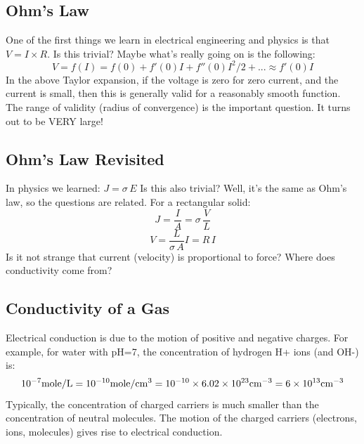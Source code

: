 \subsection{Ohm’s Law}
One of the first things we learn in electrical engineering and physics is that  $V = I \times R$.  Is this trivial? Maybe what’s really going on is the following:
    \begin{equation}
        V = f(I) = f(0) + f'(0)I + f''(0){I^2}/2 + ... \approx f'(0)I
    \end{equation}
In the above Taylor expansion, if the voltage is zero for zero current, and the current is small, then this is generally valid for a reasonably smooth function.   The range of validity (radius of convergence) is the important question. It turns out to be VERY large!
\subsection{Ohm’s Law Revisited}
 In physics we learned:  $J = \sigma \,E$  Is this also trivial? Well, it’s the same as Ohm’s law, so the questions are related. For a rectangular solid:
    \begin{equation}
        J = \frac{I}{A} = \sigma \,\frac{V}{L} \end{equation}\begin{equation}  V = \frac{L}{{\sigma \,A}}I = R\,I
    \end{equation}
Is it not strange that current (velocity) is proportional to force?  Where does conductivity come from?
\subsection{Conductivity of a Gas}
Electrical conduction is due to the motion of positive and negative charges.   For example, for  water with pH=7, the concentration of hydrogen H+ ions (and OH-) is:
    \begin{equation}
        {10^{ - 7}}{\rm{mole/L}} = {\rm{1}}{{\rm{0}}^{{\rm{ - 10}}}}{\rm{mole/c}}{{\rm{m}}^{\rm{3}}}
        = {\rm{1}}{{\rm{0}}^{{\rm{ - 10}}}} \times 6.02 \times {10^{23}}{\rm{c}}{{\rm{m}}^{ - 3}}
        = 6 \times {10^{13}}{\rm{c}}{{\rm{m}}^{ - 3}}
    \end{equation}
Typically, the concentration of charged carriers is much smaller than the concentration of neutral molecules.  The motion of the charged carriers (electrons, ions, molecules) gives rise to electrical conduction.
